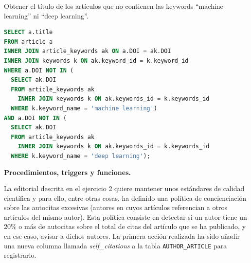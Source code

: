 \documentclass[
    12pt,
    a4paper,
    addpoints,
    answers,
    convocatoria=ext,
    titulacion=NoCD,
    curso=2023/2024,
]{db-exam}
\begin{document}
\begin{questions}
\begin{parts}
\begin{subparts}
\subpart[\half] Obtener el título de los artículos que no contienen las keywords ``machine learning'' ni ``deep learning''.

\begin{solution}[16em]
\begin{lstlisting}[language=SQL]
SELECT a.title 
FROM article a
INNER JOIN article_keywords ak ON a.DOI = ak.DOI
INNER JOIN keywords k ON ak.keyword_id = k.keyword_id
WHERE a.DOI NOT IN (
  SELECT ak.DOI
  FROM article_keywords ak
    INNER JOIN keywords k ON ak.keywords_id = k.keywords_id
  WHERE k.keyword_name = 'machine learning')
AND a.DOI NOT IN (    
  SELECT ak.DOI
  FROM article_keywords ak
    INNER JOIN keywords k ON ak.keywords_id = k.keywords_id
  WHERE k.keyword_name = 'deep learning');
\end{lstlisting}
\end{solution}

\end{subparts}
\end{parts}

\newpage
\question[2\half] \textbf{Procedimientos, triggers y funciones.}

La editorial descrita en el ejercicio 2 quiere mantener unos estándares de calidad científica y para ello, entre otras cosas, ha definido una política de concienciación sobre las autocitas excesivas (autores en cuyos artículos referencian a otros artículos del mismo autor). Esta política consiste en detectar si un autor tiene un 20\% o más de autocitas sobre el total de citas del artículo que se ha publicado, y en ese caso, avisar a dichos autores. La primera acción realizada ha sido añadir una nueva columna llamada \textit{self\_citations} a la tabla \texttt{AUTHOR\_ARTICLE} para registrarlo.


\end{questions}
\end{document}
